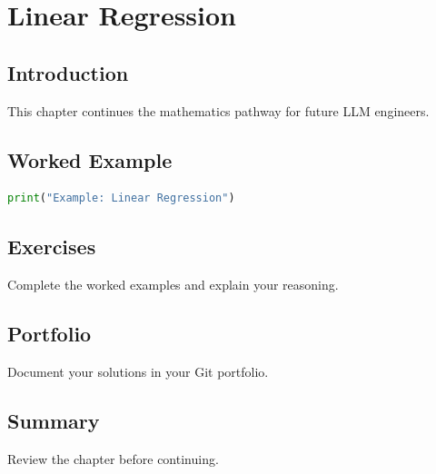 \chapter{Linear Regression}
\label{chap:vol4-29}



\section{Introduction}
This chapter continues the mathematics pathway for future LLM engineers.

\section{Worked Example}
\begin{lstlisting}[language=Python]
print("Example: Linear Regression")
\end{lstlisting}

\section{Exercises}
\begin{exercise}
Complete the worked examples and explain your reasoning.
\end{exercise}

\section{Portfolio}
Document your solutions in your Git portfolio.

\section{Summary}
Review the chapter before continuing.
